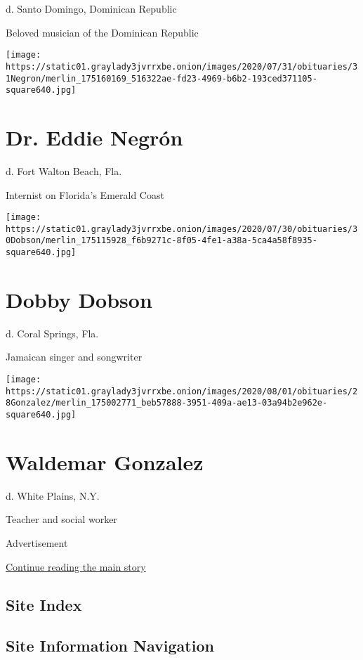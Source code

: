 d. Santo Domingo, Dominican Republic

Beloved musician of the Dominican Republic

\texttt{[image: https://static01.graylady3jvrrxbe.onion/images/2020/07/31/obituaries/31Negron/merlin\_175160169\_516322ae-fd23-4969-b6b2-193ced371105-square640.jpg]}

\hypertarget{dr-eddie-negruxf3n}{%
\section{Dr. Eddie Negrón}\label{dr-eddie-negruxf3n}}

d. Fort Walton Beach, Fla.

Internist on Florida's Emerald Coast

\texttt{[image: https://static01.graylady3jvrrxbe.onion/images/2020/07/30/obituaries/30Dobson/merlin\_175115928\_f6b9271c-8f05-4fe1-a38a-5ca4a58f8935-square640.jpg]}

\hypertarget{dobby-dobson}{%
\section{Dobby Dobson}\label{dobby-dobson}}

d. Coral Springs, Fla.

Jamaican singer and songwriter

\texttt{[image: https://static01.graylady3jvrrxbe.onion/images/2020/08/01/obituaries/28Gonzalez/merlin\_175002771\_beb57888-3951-409a-ae13-03a94b2e962e-square640.jpg]}

\hypertarget{waldemar-gonzalez}{%
\section{Waldemar Gonzalez}\label{waldemar-gonzalez}}

d. White Plains, N.Y.

Teacher and social worker

Advertisement

\protect\hyperlink{after-bottom}{Continue reading the main story}

\hypertarget{site-index}{%
\subsection{Site Index}\label{site-index}}

\hypertarget{site-information-navigation}{%
\subsection{Site Information
Navigation}\label{site-information-navigation}}

